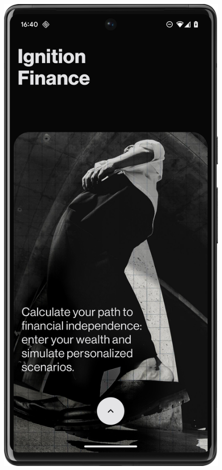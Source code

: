 \begin{figure}[H]
    \centering
    \begin{minipage}{0.24\textwidth}
        \centering
        \includegraphics[width=\textwidth]{foto/intro_screen}

\end{minipage}
\end{figure}
